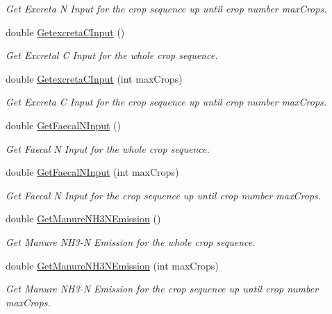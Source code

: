 \begin{DoxyCompactItemize}
\begin{DoxyCompactList}\small\item\em Get Excreta N Input for the crop sequence up until crop number max\+Crops. \end{DoxyCompactList}\item 
double \mbox{\hyperlink{class_crop_sequence_class_a75833d7bee54d75e0c37c0e0294e8545}{Getexcreta\+C\+Input}} ()
\begin{DoxyCompactList}\small\item\em Get Excretal C Input for the whole crop sequence. \end{DoxyCompactList}\item 
double \mbox{\hyperlink{class_crop_sequence_class_a1a450f8a00bdf08b51a6e2887414740c}{Getexcreta\+C\+Input}} (int max\+Crops)
\begin{DoxyCompactList}\small\item\em Get Excreta C Input for the crop sequence up until crop number max\+Crops. \end{DoxyCompactList}\item 
double \mbox{\hyperlink{class_crop_sequence_class_afc5a4bc2374d2066bb750327ab3346b4}{Get\+Faecal\+N\+Input}} ()
\begin{DoxyCompactList}\small\item\em Get Faecal N Input for the whole crop sequence. \end{DoxyCompactList}\item 
double \mbox{\hyperlink{class_crop_sequence_class_a10e45bf7094f9d5db7921651218e887c}{Get\+Faecal\+N\+Input}} (int max\+Crops)
\begin{DoxyCompactList}\small\item\em Get Faecal N Input for the crop sequence up until crop number max\+Crops. \end{DoxyCompactList}\item 
double \mbox{\hyperlink{class_crop_sequence_class_af8af7306c552da96cad6d197a5758aa9}{Get\+Manure\+N\+H3\+N\+Emission}} ()
\begin{DoxyCompactList}\small\item\em Get Manure N\+H3-\/N Emission for the whole crop sequence. \end{DoxyCompactList}\item 
double \mbox{\hyperlink{class_crop_sequence_class_a3f7fd421be741608547d04626b904288}{Get\+Manure\+N\+H3\+N\+Emission}} (int max\+Crops)
\begin{DoxyCompactList}\small\item\em Get Manure N\+H3-\/N Emission for the crop sequence up until crop number max\+Crops. \end{DoxyCompactList}\item 

\end{DoxyCompactItemize}
